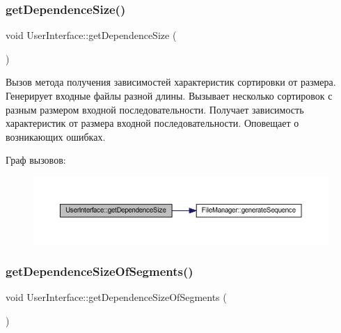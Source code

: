 \hypertarget{class_user_interface_af7c9d93ec693f70dcfbdd9e6a080abc7}{}\label{class_user_interface_af7c9d93ec693f70dcfbdd9e6a080abc7} 
\subsubsection{\texorpdfstring{get\+Dependence\+Size()}{getDependenceSize()}}
{\footnotesize\ttfamily void User\+Interface\+::get\+Dependence\+Size (\begin{DoxyParamCaption}{ }\end{DoxyParamCaption})\hspace{0.3cm}{\ttfamily [private]}}



Вызов метода получения зависимостей характеристик сортировки от размера. Генерирует входные файлы разной длины. Вызывает несколько сортировок с разным размером входной последовательности. Получает зависимость характеристик от размера входной последовательности. Оповещает о возникающих ошибках. 

Граф вызовов\+:\nopagebreak
\begin{figure}[H]
\begin{center}
\leavevmode
\includegraphics[width=350pt]{class_user_interface_af7c9d93ec693f70dcfbdd9e6a080abc7_cgraph}
\end{center}
\end{figure}
\hypertarget{class_user_interface_aaac8a635efdb79276275f9d1ea265cd7}{}\label{class_user_interface_aaac8a635efdb79276275f9d1ea265cd7} 
\subsubsection{\texorpdfstring{get\+Dependence\+Size\+Of\+Segments()}{getDependenceSizeOfSegments()}}
{\footnotesize\ttfamily void User\+Interface\+::get\+Dependence\+Size\+Of\+Segments (\begin{DoxyParamCaption}{ }\end{DoxyParamCaption})\hspace{0.3cm}{\ttfamily [private]}}




